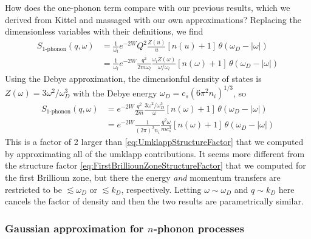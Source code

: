 \documentclass{article}
\begin{document}
How does the one-phonon term compare with our previous results, which we derived from Kittel \cite{quantum} and massaged with our own approximations? Replacing the dimensionless variables with their definitions, we find
\begin{align}
S_\text{1-phonon}(q, \omega) &= \frac{1}{\omega_l} e^{-2 W} Q^2 \frac{Z(u)}{u}[n(u) + 1]\,\theta(\omega_D-|\omega|)  \label{eq:1PhononContribution}\\
   &= \frac{1}{\omega_l} e^{-2 W} \frac{q^2}{2 m \omega_l} \frac{\omega_l Z(\omega)}{\omega/\omega_l}[n(\omega) + 1]\,\theta(\omega_D-|\omega|)
\end{align}
Using the Debye approximation, the dimensionful density of states is $Z(\omega) = 3 \omega^2 / \omega_D^3$ with the Debye energy $\omega_D = c_s(6 \pi^2 n_i)^{1/3}$, so
\begin{align}
S_\text{1-phonon}(q, \omega) &= e^{-2 W} \frac{q^2}{2 m} \frac{3 \omega^2 / \omega_D^3}{\omega}[n(\omega) + 1]\,\theta(\omega_D-|\omega|) \nonumber\\
 &= e^{-2 W} \frac{1}{(2 \pi)^2 n_i} \frac{q^2\omega}{m c_s^3} [n(\omega) + 1]\,\theta(\omega_D-|\omega|)
\end{align}
This is a factor of 2 larger than \eqref{eq:UmklappStructureFactor} that we computed by approximating all of the umklapp contributions. It seems more different from the structure factor \eqref{eq:FirstBrilliounZoneStructureFactor} that we computed for the first Brillioun zone, but there the energy \emph{and} momentum transfers are restricted to be $\lesssim \omega_D$ or $\lesssim k_D$, respectively. Letting $\omega \sim \omega_D$ and $q \sim k_D$ here cancels the factor of density and then the two results are parametrically similar.

\subsubsection{Gaussian approximation for $n$-phonon processes}
\end{document}
